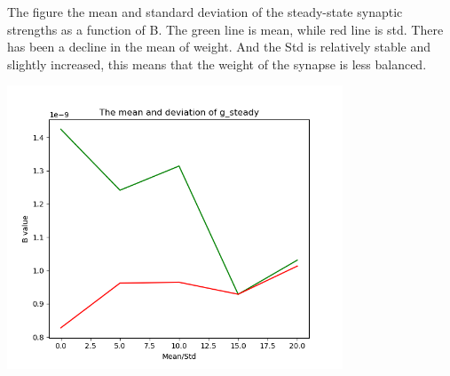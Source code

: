 \documentclass[fleqn,11pt]{article}
\begin{document}
\par The figure the mean and standard deviation of the steady-state synaptic strengths as a function of B.
The green line is mean, while red line is std. There has been a decline in the mean of weight.
And the Std is relatively stable and slightly increased, this means that the weight of the synapse is less balanced.

\begin{center} 
  \includegraphics[width=10cm]{graphs/PartB_Question4_mean_g_std_r.png}
\end{center}
\end{document}
